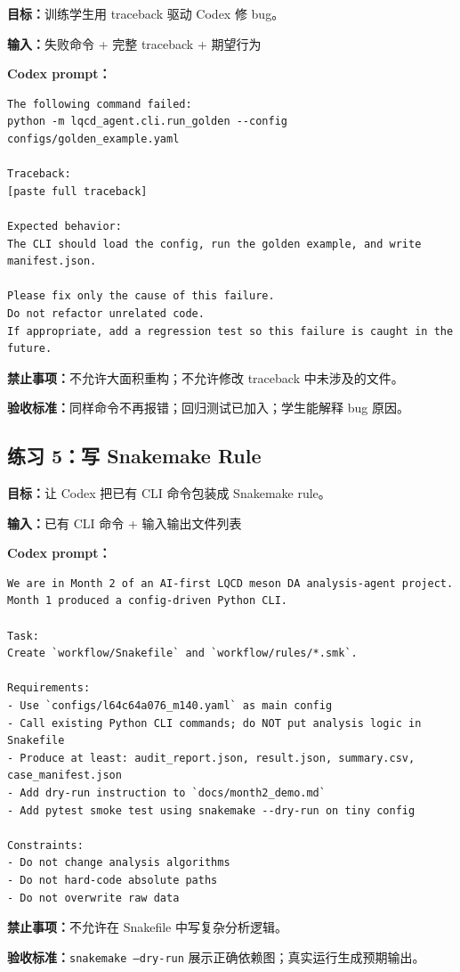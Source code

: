 \documentclass[11pt,a4paper,fontset=fandol]{ctexart}
\begin{document}
\textbf{目标：}训练学生用 traceback 驱动 Codex 修 bug。

\textbf{输入：}失败命令 + 完整 traceback + 期望行为

\textbf{Codex prompt：}
\begin{lstlisting}
The following command failed:
python -m lqcd_agent.cli.run_golden --config configs/golden_example.yaml

Traceback:
[paste full traceback]

Expected behavior:
The CLI should load the config, run the golden example, and write manifest.json.

Please fix only the cause of this failure.
Do not refactor unrelated code.
If appropriate, add a regression test so this failure is caught in the future.
\end{lstlisting}

\textbf{禁止事项：}不允许大面积重构；不允许修改 traceback 中未涉及的文件。

\textbf{验收标准：}同样命令不再报错；回归测试已加入；学生能解释 bug 原因。

\subsection{练习 5：写 Snakemake Rule}

\textbf{目标：}让 Codex 把已有 CLI 命令包装成 Snakemake rule。

\textbf{输入：}已有 CLI 命令 + 输入输出文件列表

\textbf{Codex prompt：}
\begin{lstlisting}
We are in Month 2 of an AI-first LQCD meson DA analysis-agent project.
Month 1 produced a config-driven Python CLI.

Task:
Create `workflow/Snakefile` and `workflow/rules/*.smk`.

Requirements:
- Use `configs/l64c64a076_m140.yaml` as main config
- Call existing Python CLI commands; do NOT put analysis logic in Snakefile
- Produce at least: audit_report.json, result.json, summary.csv, case_manifest.json
- Add dry-run instruction to `docs/month2_demo.md`
- Add pytest smoke test using snakemake --dry-run on tiny config

Constraints:
- Do not change analysis algorithms
- Do not hard-code absolute paths
- Do not overwrite raw data
\end{lstlisting}

\textbf{禁止事项：}不允许在 Snakefile 中写复杂分析逻辑。

\textbf{验收标准：}\texttt{snakemake --dry-run} 展示正确依赖图；真实运行生成预期输出。
\end{document}
